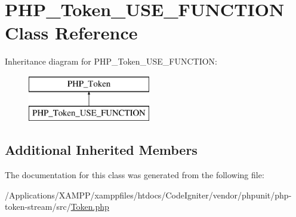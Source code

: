 \hypertarget{class_p_h_p___token___u_s_e___f_u_n_c_t_i_o_n}{}\section{P\+H\+P\+\_\+\+Token\+\_\+\+U\+S\+E\+\_\+\+F\+U\+N\+C\+T\+I\+ON Class Reference}
\label{class_p_h_p___token___u_s_e___f_u_n_c_t_i_o_n}
Inheritance diagram for P\+H\+P\+\_\+\+Token\+\_\+\+U\+S\+E\+\_\+\+F\+U\+N\+C\+T\+I\+ON\+:\begin{figure}[H]
\begin{center}
\leavevmode
\includegraphics[height=2.000000cm]{class_p_h_p___token___u_s_e___f_u_n_c_t_i_o_n}
\end{center}
\end{figure}
\subsection*{Additional Inherited Members}


The documentation for this class was generated from the following file\+:\begin{DoxyCompactItemize}
\item 
/\+Applications/\+X\+A\+M\+P\+P/xamppfiles/htdocs/\+Code\+Igniter/vendor/phpunit/php-\/token-\/stream/src/\mbox{\hyperlink{_token_8php}{Token.\+php}}\end{DoxyCompactItemize}
